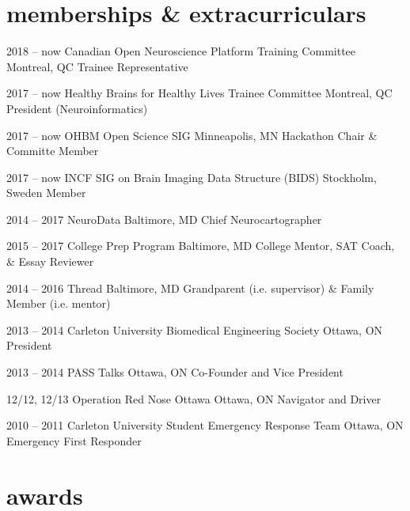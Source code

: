 \documentclass[]{friggeri-cv} %
\begin{document}
\clearpage
\section{memberships \& extracurriculars}

\begin{entrylist}
\entry
{2018 -- now}
{Canadian Open Neuroscience Platform Training Committee}
{Montreal, QC}
{Trainee Representative}

\entry
{2017 -- now}
{Healthy Brains for Healthy Lives Trainee Committee}
{Montreal, QC}
{President (Neuroinformatics)}

\entry
{2017 -- now}
{OHBM Open Science SIG}
{Minneapolis, MN}
{Hackathon Chair \& Committe Member}

\entry
{2017 -- now}
{INCF SIG on Brain Imaging Data Structure (BIDS)}
{Stockholm, Sweden}
{Member}

\entry
{2014 -- 2017}
{NeuroData}
{Baltimore, MD}
{Chief Neurocartographer}

\entry
{2015 -- 2017}
{College Prep Program}
{Baltimore, MD}
{College Mentor, SAT Coach, \& Essay Reviewer}

\entry
{2014 -- 2016}
{Thread}
{Baltimore, MD}
{Grandparent (i.e. supervisor) \& Family Member (i.e. mentor) }

\entry
{2013 -- 2014}
{Carleton University Biomedical Engineering Society}
{Ottawa, ON}
{President}

\entry
{2013 -- 2014}
{PASS Talks}
{Ottawa, ON}
{Co-Founder and Vice President}

\entry
{12/12, 12/13}
{Operation Red Nose Ottawa}
{Ottawa, ON}
{Navigator and Driver}

\entry
{2010 -- 2011}
{Carleton University Student Emergency Response Team}
{Ottawa, ON}
{Emergency First Responder}
\end{entrylist}


\section{awards}
\end{document}

